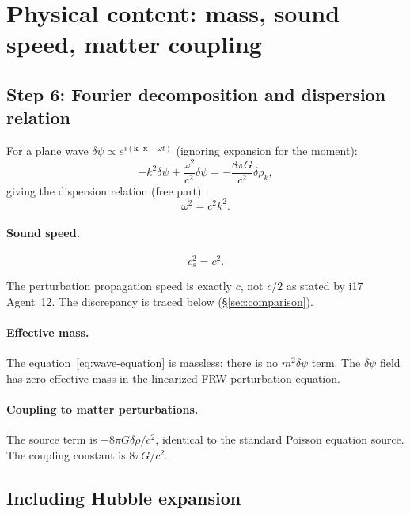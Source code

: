 \documentclass[aps,prd,twocolumn,nofootinbib]{revtex4-2}
\newcommand{\dpsi}{\delta\psi}
\begin{document}
\section{Physical content: mass, sound speed, matter coupling}
\label{sec:physics}

\subsection{Step 6: Fourier decomposition and dispersion relation}

For a plane wave $\dpsi \propto e^{i(\mathbf{k}\cdot\mathbf{x} - \omega t)}$
(ignoring expansion for the moment):
\begin{equation}
-k^2\dpsi + \frac{\omega^2}{c^2}\dpsi = -\frac{8\pi G}{c^2}\delta\rho_k,
\end{equation}
giving the dispersion relation (free part):
\begin{equation}
\omega^2 = c^2 k^2.
\label{eq:dispersion}
\end{equation}

\paragraph{Sound speed.}
\begin{equation}
\boxed{c_s^2 = c^2.}
\label{eq:cs-result}
\end{equation}

The perturbation propagation speed is exactly $c$, not $c/2$ as
stated by i17 Agent~12. The discrepancy is traced below (\S\ref{sec:comparison}).

\paragraph{Effective mass.}
The equation~\eqref{eq:wave-equation} is massless: there is no $m^2\dpsi$
term. The $\dpsi$ field has zero effective mass in the linearized FRW
perturbation equation.

\paragraph{Coupling to matter perturbations.}
The source term is $-8\pi G\delta\rho/c^2$, identical to the standard
Poisson equation source. The coupling constant is $8\pi G/c^2$.

\subsection{Including Hubble expansion}
\end{document}
